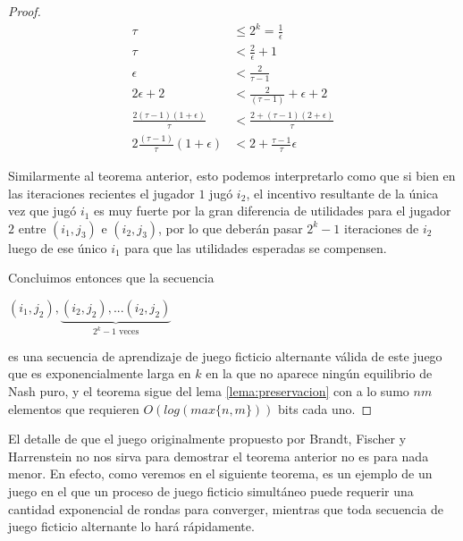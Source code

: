 \begin{proof}
    \begin{align*}
        \tau                        &\le 2^k = \frac{1}{\epsilon} \\
        \tau                        &< \frac{2}{\epsilon} + 1 \\
        \epsilon                    &< \frac{2}{\tau - 1}  \\
        2 \epsilon + 2              &< \frac{2}{(\tau - 1)} + \epsilon + 2 \\
        \frac{2(\tau - 1)(1 + \epsilon)}{\tau} &< \frac{2 + (\tau - 1) (2 + \epsilon)}{\tau} \\
        2\frac{(\tau - 1)}{\tau}(1 + \epsilon) &< 2+\frac{\tau-1}{\tau}\epsilon
    \end{align*}

    Similarmente al teorema anterior, esto podemos interpretarlo como que si bien en las iteraciones recientes el jugador $1$ jugó $i_2$, el incentivo resultante de la única vez que jugó $i_1$ es muy fuerte por la gran diferencia de utilidades para el jugador $2$ entre $(i_1, j_3)$ e $(i_2, j_3)$, por lo que deberán pasar $2^{k}-1$ iteraciones de $i_2$ luego de ese único $i_1$ para que las utilidades esperadas se compensen.

    Concluimos entonces que la secuencia

    \begin{center}
    \begin{math}
        (i_1, j_2), \underbrace{(i_2, j_2), ... (i_2, j_2)}_{\text{$2^k - 1$ veces}}
    \end{math}
    \end{center}

    es una secuencia de aprendizaje de juego ficticio alternante válida de este juego que es exponencialmente larga en $k$ en la que no aparece ningún equilibrio de Nash puro, y el teorema sigue del lema \ref{lema:preservacion} con a lo sumo $nm$ elementos que requieren $O(log(max\{n,m\}))$ bits cada uno.
\end{proof}

El detalle de que el juego originalmente propuesto por Brandt, Fischer y Harrenstein no nos sirva para demostrar el teorema anterior no es para nada menor. En efecto, como veremos en el siguiente teorema, es un ejemplo de un juego en el que un proceso de juego ficticio simultáneo puede requerir una cantidad exponencial de rondas para converger, mientras que toda secuencia de juego ficticio alternante lo hará rápidamente.


